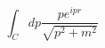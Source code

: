 \documentclass{minimal}
\begin{document}
$$\int_C dp \frac{p e^{ipr}}{\sqrt{p^2 + m^2}}$$
\end{document}
